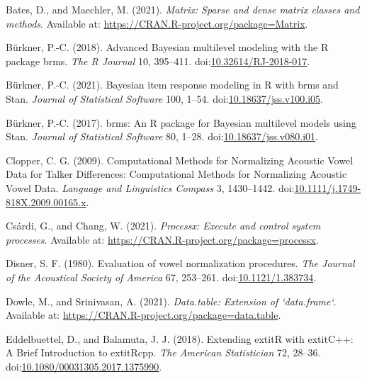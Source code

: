 \documentclass[utf8]{frontiers_suppmat} %
\newlength{\cslhangindent}
\newlength{\cslentryspacingunit} %
\newenvironment{CSLReferences}[2] %
 {%
  \setlength{\parindent}{0pt}
  \ifodd #1
  \let\oldpar\par
  \def\par{\hangindent=\cslhangindent\oldpar}
  \fi
  \setlength{\parskip}{#2\cslentryspacingunit}
 }%
 {}
\begin{document}
\begin{CSLReferences}{1}{0}
\leavevmode{}%
Bates, D., and Maechler, M. (2021). \emph{Matrix: Sparse and dense matrix classes and methods}. Available at: \url{https://CRAN.R-project.org/package=Matrix}.

\leavevmode{}%
Bürkner, P.-C. (2018). Advanced {Bayesian} multilevel modeling with the {R} package {brms}. \emph{The R Journal} 10, 395--411. doi:\href{https://doi.org/10.32614/RJ-2018-017}{10.32614/RJ-2018-017}.

\leavevmode{}%
Bürkner, P.-C. (2021). Bayesian item response modeling in {R} with {brms} and {Stan}. \emph{Journal of Statistical Software} 100, 1--54. doi:\href{https://doi.org/10.18637/jss.v100.i05}{10.18637/jss.v100.i05}.

\leavevmode{}%
Bürkner, P.-C. (2017). {brms}: An {R} package for {Bayesian} multilevel models using {Stan}. \emph{Journal of Statistical Software} 80, 1--28. doi:\href{https://doi.org/10.18637/jss.v080.i01}{10.18637/jss.v080.i01}.

\leavevmode{}%
Clopper, C. G. (2009). Computational {Methods} for {Normalizing Acoustic Vowel Data} for {Talker Differences}: {Computational Methods} for {Normalizing Acoustic Vowel Data}. \emph{Language and Linguistics Compass} 3, 1430--1442. doi:\href{https://doi.org/10.1111/j.1749-818X.2009.00165.x}{10.1111/j.1749-818X.2009.00165.x}.

\leavevmode{}%
Csárdi, G., and Chang, W. (2021). \emph{Processx: Execute and control system processes}. Available at: \url{https://CRAN.R-project.org/package=processx}.

\leavevmode{}%
Disner, S. F. (1980). Evaluation of vowel normalization procedures. \emph{The Journal of the Acoustical Society of America} 67, 253--261. doi:\href{https://doi.org/10.1121/1.383734}{10.1121/1.383734}.

\leavevmode{}%
Dowle, M., and Srinivasan, A. (2021). \emph{Data.table: Extension of `data.frame`}. Available at: \url{https://CRAN.R-project.org/package=data.table}.

\leavevmode{}%
Eddelbuettel, D., and Balamuta, J. J. (2018). {Extending extit{R} with extit{C++}: A Brief Introduction to extit{Rcpp}}. \emph{The American Statistician} 72, 28--36. doi:\href{https://doi.org/10.1080/00031305.2017.1375990}{10.1080/00031305.2017.1375990}.


\end{CSLReferences}
\end{document}
